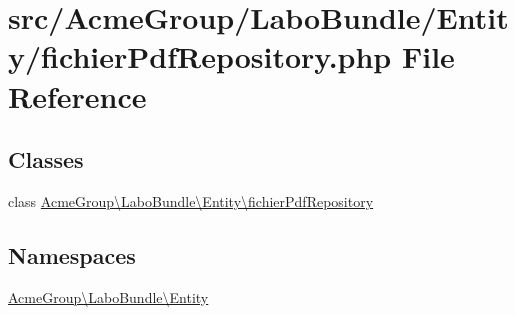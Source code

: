 \hypertarget{fichier_pdf_repository_8php}{\section{src/\+Acme\+Group/\+Labo\+Bundle/\+Entity/fichier\+Pdf\+Repository.php File Reference}
\label{fichier_pdf_repository_8php}
}
\subsection*{Classes}
\begin{DoxyCompactItemize}
\item 
class \hyperlink{class_acme_group_1_1_labo_bundle_1_1_entity_1_1fichier_pdf_repository}{Acme\+Group\textbackslash{}\+Labo\+Bundle\textbackslash{}\+Entity\textbackslash{}fichier\+Pdf\+Repository}
\end{DoxyCompactItemize}
\subsection*{Namespaces}
\begin{DoxyCompactItemize}
\item 
 \hyperlink{namespace_acme_group_1_1_labo_bundle_1_1_entity}{Acme\+Group\textbackslash{}\+Labo\+Bundle\textbackslash{}\+Entity}
\end{DoxyCompactItemize}
